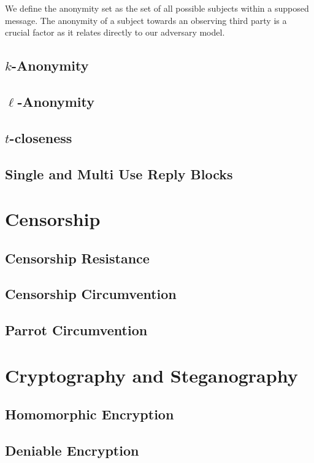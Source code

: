 We define the anonymity set as the set of all possible subjects within a supposed message. The anonymity of a subject towards an observing third party is a crucial factor as it relates directly to our adversary model.

\section{$k$-Anonymity}
\section{$\ell$-Anonymity}
\section{$t$-closeness}
\section{Single and Multi Use Reply Blocks}
\chapter{Censorship}
\section{Censorship Resistance}
\section{Censorship Circumvention}
\section{Parrot Circumvention}

\chapter{Cryptography and Steganography}
\section{Homomorphic Encryption}
\section{Deniable Encryption}
